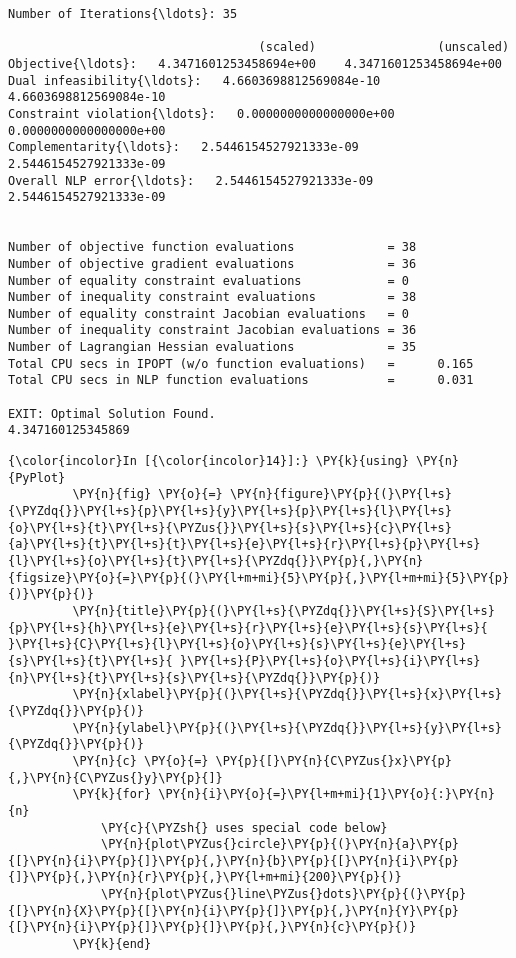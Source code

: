 \begin{Verbatim}[commandchars=\\\{\}]
Number of Iterations{\ldots}: 35

                                   (scaled)                 (unscaled)
Objective{\ldots}:   4.3471601253458694e+00    4.3471601253458694e+00
Dual infeasibility{\ldots}:   4.6603698812569084e-10    4.6603698812569084e-10
Constraint violation{\ldots}:   0.0000000000000000e+00    0.0000000000000000e+00
Complementarity{\ldots}:   2.5446154527921333e-09    2.5446154527921333e-09
Overall NLP error{\ldots}:   2.5446154527921333e-09    2.5446154527921333e-09


Number of objective function evaluations             = 38
Number of objective gradient evaluations             = 36
Number of equality constraint evaluations            = 0
Number of inequality constraint evaluations          = 38
Number of equality constraint Jacobian evaluations   = 0
Number of inequality constraint Jacobian evaluations = 36
Number of Lagrangian Hessian evaluations             = 35
Total CPU secs in IPOPT (w/o function evaluations)   =      0.165
Total CPU secs in NLP function evaluations           =      0.031

EXIT: Optimal Solution Found.
4.347160125345869

    \end{Verbatim}

    \begin{Verbatim}[commandchars=\\\{\}]
{\color{incolor}In [{\color{incolor}14}]:} \PY{k}{using} \PY{n}{PyPlot}
         \PY{n}{fig} \PY{o}{=} \PY{n}{figure}\PY{p}{(}\PY{l+s}{\PYZdq{}}\PY{l+s}{p}\PY{l+s}{y}\PY{l+s}{p}\PY{l+s}{l}\PY{l+s}{o}\PY{l+s}{t}\PY{l+s}{\PYZus{}}\PY{l+s}{s}\PY{l+s}{c}\PY{l+s}{a}\PY{l+s}{t}\PY{l+s}{t}\PY{l+s}{e}\PY{l+s}{r}\PY{l+s}{p}\PY{l+s}{l}\PY{l+s}{o}\PY{l+s}{t}\PY{l+s}{\PYZdq{}}\PY{p}{,}\PY{n}{figsize}\PY{o}{=}\PY{p}{(}\PY{l+m+mi}{5}\PY{p}{,}\PY{l+m+mi}{5}\PY{p}{)}\PY{p}{)}
         \PY{n}{title}\PY{p}{(}\PY{l+s}{\PYZdq{}}\PY{l+s}{S}\PY{l+s}{p}\PY{l+s}{h}\PY{l+s}{e}\PY{l+s}{r}\PY{l+s}{e}\PY{l+s}{s}\PY{l+s}{ }\PY{l+s}{C}\PY{l+s}{l}\PY{l+s}{o}\PY{l+s}{s}\PY{l+s}{e}\PY{l+s}{s}\PY{l+s}{t}\PY{l+s}{ }\PY{l+s}{P}\PY{l+s}{o}\PY{l+s}{i}\PY{l+s}{n}\PY{l+s}{t}\PY{l+s}{s}\PY{l+s}{\PYZdq{}}\PY{p}{)}
         \PY{n}{xlabel}\PY{p}{(}\PY{l+s}{\PYZdq{}}\PY{l+s}{x}\PY{l+s}{\PYZdq{}}\PY{p}{)}
         \PY{n}{ylabel}\PY{p}{(}\PY{l+s}{\PYZdq{}}\PY{l+s}{y}\PY{l+s}{\PYZdq{}}\PY{p}{)}
         \PY{n}{c} \PY{o}{=} \PY{p}{[}\PY{n}{C\PYZus{}x}\PY{p}{,}\PY{n}{C\PYZus{}y}\PY{p}{]}
         \PY{k}{for} \PY{n}{i}\PY{o}{=}\PY{l+m+mi}{1}\PY{o}{:}\PY{n}{n}
             \PY{c}{\PYZsh{} uses special code below}
             \PY{n}{plot\PYZus{}circle}\PY{p}{(}\PY{n}{a}\PY{p}{[}\PY{n}{i}\PY{p}{]}\PY{p}{,}\PY{n}{b}\PY{p}{[}\PY{n}{i}\PY{p}{]}\PY{p}{,}\PY{n}{r}\PY{p}{,}\PY{l+m+mi}{200}\PY{p}{)}
             \PY{n}{plot\PYZus{}line\PYZus{}dots}\PY{p}{(}\PY{p}{[}\PY{n}{X}\PY{p}{[}\PY{n}{i}\PY{p}{]}\PY{p}{,}\PY{n}{Y}\PY{p}{[}\PY{n}{i}\PY{p}{]}\PY{p}{]}\PY{p}{,}\PY{n}{c}\PY{p}{)}
         \PY{k}{end}
\end{Verbatim}


